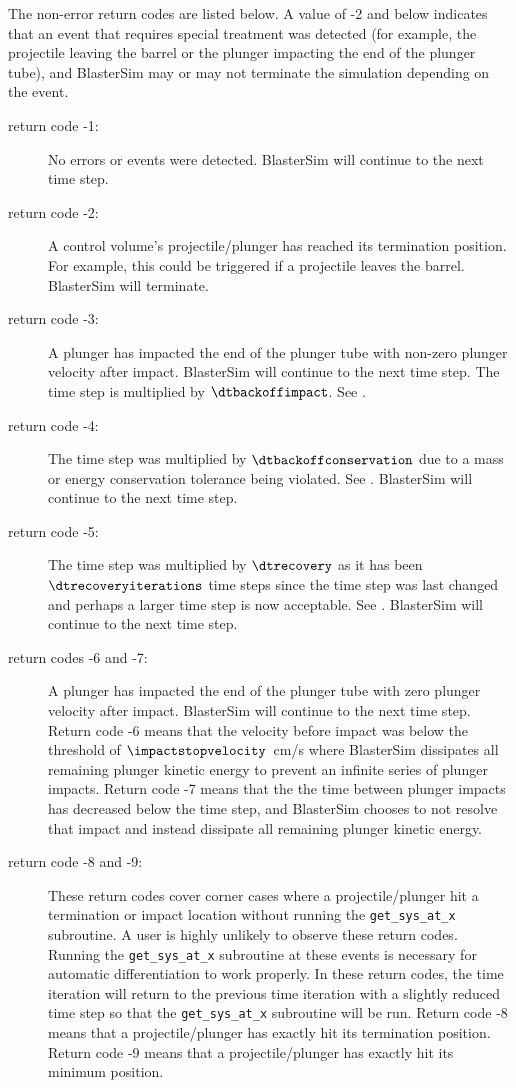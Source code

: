 The non-error return codes are listed below.
A value of -2 and below indicates that an event that requires special treatment was detected (for example, the projectile leaving the barrel or the plunger impacting the end of the plunger tube), and BlasterSim may or may not terminate the simulation depending on the event.
\begin{description}
\item[return code -1:] No errors or events were detected.
BlasterSim will continue to the next time step.
\item[return code -2:] A control volume's projectile/plunger has reached its termination position.
For example, this could be triggered if a projectile leaves the barrel.
BlasterSim will terminate.
\item[return code -3:] A plunger has impacted the end of the plunger tube with non-zero plunger velocity after impact.
BlasterSim will continue to the next time step.
The time step is multiplied by $\dtbackoffimpact$.
See .
\item[return code -4:] The time step was multiplied by $\dtbackoffconservation$ due to a mass or energy conservation tolerance being violated.
See .
BlasterSim will continue to the next time step.
\item[return code -5:] The time step was multiplied by $\dtrecovery$ as it has been $\dtrecoveryiterations$ time steps since the time step was last changed and perhaps a larger time step is now acceptable.
See .
BlasterSim will continue to the next time step.
\item[return codes -6 and -7:] A plunger has impacted the end of the plunger tube with zero plunger velocity after impact.
BlasterSim will continue to the next time step.
Return code -6 means that the velocity before impact was below the threshold of $\impactstopvelocity$~cm/s where BlasterSim dissipates all remaining plunger kinetic energy to prevent an infinite series of plunger impacts.
Return code -7 means that the the time between plunger impacts has decreased below the time step, and BlasterSim chooses to not resolve that impact and instead dissipate all remaining plunger kinetic energy.
\item[return code -8 and -9:] These return codes cover corner cases where a projectile/plunger hit a termination or impact location without running the \texttt{get\_sys\_at\_x} subroutine.
A user is highly unlikely to observe these return codes.
Running the \texttt{get\_sys\_at\_x} subroutine at these events is necessary for automatic differentiation to work properly.
In these return codes, the time iteration will return to the previous time iteration with a slightly reduced time step so that the \texttt{get\_sys\_at\_x} subroutine will be run.
Return code -8 means that a projectile/plunger has exactly hit its termination position.
Return code -9 means that a projectile/plunger has exactly hit its minimum position.
\end{description}

